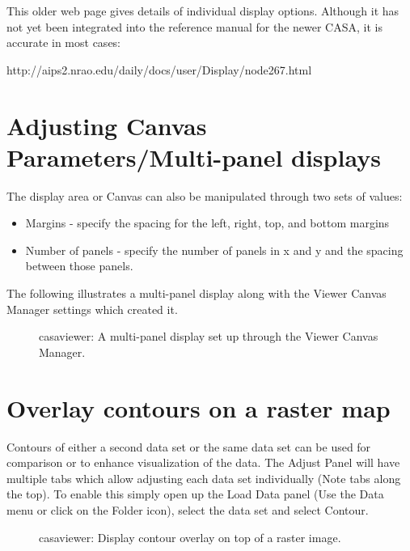 This older web page gives details of individual display options.
Although it has not yet been integrated into the reference manual for
the newer CASA, it is accurate in most cases: 

  http://aips2.nrao.edu/daily/docs/user/Display/node267.html


\section{Adjusting Canvas Parameters/Multi-panel displays}
\label{section:view.canvas}

The display area or Canvas can also be manipulated through two sets of values:
\begin{itemize}
   \item Margins - specify the spacing for the left, right, top, and bottom margins
   \item Number of panels - specify the number of panels in x and y
         and the spacing between those panels. 
\end{itemize}

The following illustrates a multi-panel display along with the Viewer
Canvas Manager settings which created it. 

\begin{figure}[h!]
\caption{\label{fig:viewer_canvas} casaviewer: A multi-panel display
set up through the Viewer Canvas Manager.} 
\hrulefill
\end{figure}
 

\section{Overlay contours on a raster map}
\label{section:view.contours.raster}

Contours of either a second data set or the same data set can be used
for comparison or to enhance visualization of the data. The Adjust
Panel will have multiple tabs which allow adjusting each data set
individually (Note tabs along the top). To enable this simply open up
the Load Data panel (Use the Data menu or click on the Folder icon),
select the data set and select Contour. 

\begin{figure}[h!]
\caption{\label{fig:viewer_overlay} casaviewer: Display contour
overlay on top of a raster image.} 
\hrulefill
\end{figure}
 
